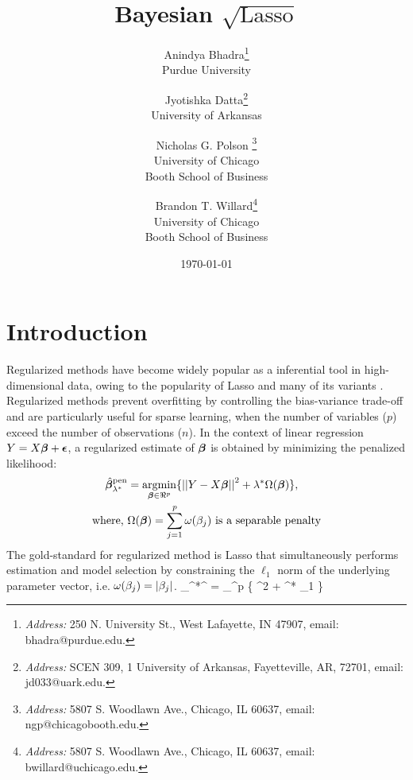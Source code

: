 \documentclass[11pt]{article}
\title{Bayesian $\sqrt{\text{Lasso}}$}
\author{
  Anindya Bhadra\footnote{
  {\em Address:} 250 N. University St., West Lafayette, IN 47907, 
  email: bhadra@purdue.edu.} \\
  Purdue University
  \and Jyotishka Datta\footnote{
  {\em Address:} SCEN 309, 1 University of Arkansas, Fayetteville, AR, 72701, 
  email: jd033@uark.edu.}\\ 
  University of Arkansas \\
  \and Nicholas G. Polson \footnote{
  {\em Address:} 5807 S. Woodlawn Ave., Chicago, IL 60637, 
  email: ngp@chicagobooth.edu.}  \\
  University of Chicago  \\
  Booth School of Business
  \and 
  Brandon T. Willard\footnote{
  {\em Address:} 5807 S. Woodlawn Ave., Chicago, IL 60637, 
  email: bwillard@uchicago.edu.} \\
  University of Chicago  \\
  Booth School of Business
}
\date{\today}
\begin{document}
\maketitle
\onehalfspacing



\section{Introduction}

Regularized methods have become widely popular as a inferential tool in high-dimensional data, owing to the popularity of Lasso \citep{tibshirani96} and many of its variants \citep{tibshirani2014praise}. Regularized methods prevent overfitting by controlling the bias-variance trade-off and are particularly useful for sparse learning, when the number of variables ($p$) exceed the number of observations ($n$). In the context of linear regression $Y = X \boldsymbol{\beta} + \boldsymbol{\epsilon}$, a regularized estimate of $\boldsymbol{\beta}$ is obtained by minimizing the penalized likelihood:
\begin{align}
\hat{\bbeta}_{\lambda^*}^{\text{pen}} & = \argmin_{\bbeta \in \Re^p} \{ \vectornorm{Y - X\bbeta}^2 + \lambda^* \Omega(\bbeta) \}, \label{eq:penalize} \\
  \text{where, } & \Omega(\bbeta) = \sum_{j=1}^{p} \omega(\beta_j) \text{ is a separable penalty}
\end{align}
The gold-standard for regularized method is Lasso that simultaneously performs estimation and model selection by constraining the $\ell_1$ norm of the underlying parameter vector, i.e. $\omega(\beta_j) = \lvert\beta_j\rvert$. 
\beq
\hat{\bbeta}_{\lambda^*}^{} = \argmin_{\bbeta \in \Re^p} \{ ^2 + \lambda^* \norm{\bbeta}_1 \} \label{eq:lasso}
\eeq
\end{document}
